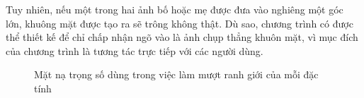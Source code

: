 \documentclass[journal]{IEEEtran}
\begin{document}
Tuy nhiên, nếu một trong hai ảnh bố hoặc mẹ được đưa vào nghiêng một góc lớn, khuông mặt được tạo ra sẽ trông không thật. Dù sao, chương trình có được thể thiết kế để chỉ chấp nhận ngõ vào là ảnh chụp thẳng khuôn mặt, vì mục đích của chương trình là tương tác trực tiếp với các người dùng.

\begin{figure}[!t]
\centering
{}
\label{refhinh12}
\caption{Mặt nạ trọng số dùng trong việc làm mượt ranh giới của mỗi đặc tính}
\end{figure}
\end{document}

